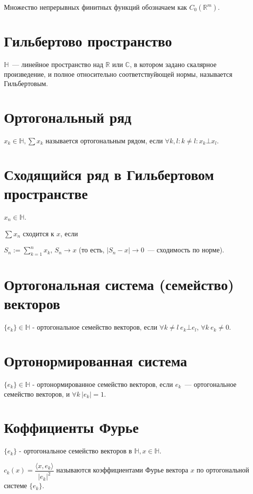 \documentclass[paper=a4, fontsize=14pt]{report}
\begin{document}
    Множество непрерывных финитных функций обозначаем как $C_0(\mathbb{R}^m)$.

	\section{Гильбертово пространство}
	$\mathds{H}$~--- линейное пространство над $\mathds{R}$ или $\mathds{C}$, в котором задано скалярное произведение, и полное относительно соответствуйющей нормы, называется Гильбертовым.

	\section{Ортогональный ряд}
	$x_k \in \mathds{H}, \sum x_k$ называется ортогональным рядом, если $\forall k, l: k \neq l: x_k \bot x_l$.

	\section{Сходящийся ряд в Гильбертовом пространстве}
	$x_n \in \mathds{H}$.

	$\sum x_n$ сходится к $x$, если

	$S_n := \sum\limits_{k = 1}^n x_k$, $S_n \rightarrow x$ (то есть, $|S_n - x| \rightarrow 0$~--- сходимость по норме).

    \section{Ортогональная система (семейство) векторов}
	$\{e_k\} \in \mathds{H}$ - ортогональное семейство векторов, если $\forall k \neq l ~ e_k \bot e_l$, $\forall k\ e_k \neq 0$.

	\section{Ортонормированная система}
	$\{e_k\} \in \mathds{H}$ - ортонормированное семейство векторов, если ${e_k}$~--- ортогональное семейство векторов, и $\forall k ~ |e_k| = 1$.

	\section{Коффициенты Фурье}
	$\{e_k\}$ - ортогональное семейство векторов в $\mathds{H}, x \in \mathds{H}$.

	$c_k(x) = \dfrac{\langle x, e_k \rangle}{|e_k|^2}$ называются коэффициентами Фурье вектора $x$ по ортогональной системе $\{e_k\}$.
\end{document}
